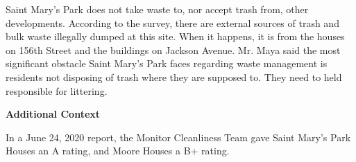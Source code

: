 Saint Mary's Park does not take waste to, nor accept trash from, other developments. According to the survey, there are external sources of trash and bulk waste illegally dumped at this site.  When it happens, it is from the houses on 156th Street and the buildings on Jackson Avenue. Mr.  Maya said the most significant obstacle Saint Mary's Park faces regarding waste management is residents not disposing of trash where they are supposed to. They need to held responsible for littering.

\textbf{Additional Context}  

In a June 24, 2020 report, the Monitor Cleanliness Team gave Saint Mary's Park Houses an A rating, and Moore Houses a B+ rating.  

 